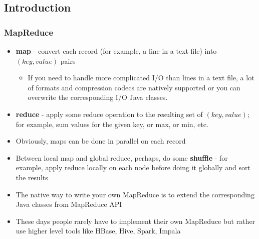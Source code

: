 \documentclass{beamer}
\begin{document}
\subsection{Introduction}
\begin{frame}
 \frametitle{MapReduce}
 \begin{itemize}
  \item {\color{mycolordef}\textbf{map}} - convert each record (for example, a line in a text file) into $(key, value)$ pairs
    \begin{itemize}
    \item  If you need to handle more complicated I/O than lines in a text file, a lot of formats and compression codecs 
    are natively supported or you can overwrite the corresponding I/O Java classes.
    \end{itemize}
  \item {\color{mycolordef}\textbf{reduce}} - apply some reduce operation to the resulting set of $(key, value)$; for example, sum values for the given key, or max, or min, etc.
  \item Obviously, maps can be done in parallel on each record
  \item Between local map and global reduce, perhaps, do some {\color{mycolordef}\textbf{shuffle}} - for example, apply reduce locally on each node before doing it globally and sort the results
  \item The native way to write your own MapReduce is to extend the corresponding Java classes from MapReduce API
  \item These days people rarely have to implement their own MapReduce but rather use higher level tools like HBase, Hive, Spark, Impala
  \end{itemize}
\end{frame}
\end{document}
